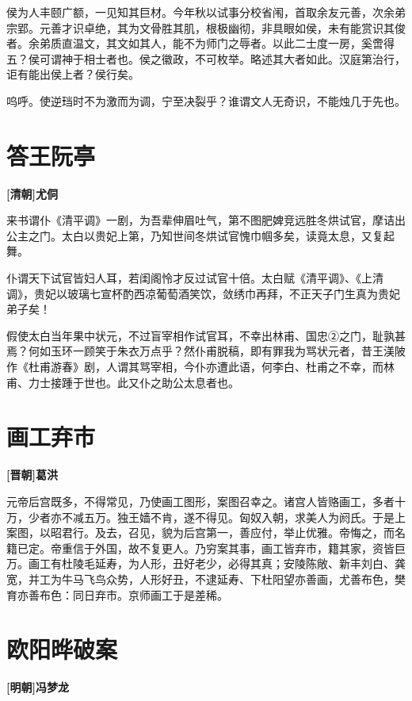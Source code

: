 \documentclass[UTF8,titlepage,oneside]{ctexbook}
\begin{document}
侯为人丰颐广额，一见知其巨材。今年秋以试事分校省闱，首取余友元善，次余弟宗郢。元善才识卓绝，其为文骨胜其肌，根极幽彻，非具眼如侯，未有能赏识其俊者。余弟质直温文，其文如其人，能不为师门之辱者。以此二士度一房，奚啻得五？侯可谓神于相士者也。侯之徽政，不可枚举。略述其大者如此。汉庭第治行，讵有能出侯上者？侯行矣。


呜呼。使逆珰时不为激而为调，宁至决裂乎？谁谓文人无奇识，不能烛几于先也。



\chapter*{答王阮亭}
\begin{center}
	\textbf{[清朝]尤侗}
\end{center}

来书谓仆《清平调》一剧，为吾辈伸眉吐气，第不图肥婢竞远胜冬烘试官，摩诘出公主之门。太白以贵妃上第，乃知世间冬烘试官愧巾帼多矣，读竟太息，又复起舞。

仆谓天下试官皆妇人耳，若闺阁怜才反过试官十倍。太白赋《清平调》、《上清调》，贵妃以玻璃七宣杯酌西凉葡萄酒笑饮，敛绣巾再拜，不正天子门生真为贵妃弟子矣！

假使太白当年果中状元，不过盲宰相作试官耳，不幸出林甫、国忠②之门，耻孰甚焉？何如玉环一顾笑于朱衣万点乎？然仆甫脱稿，即有罪我为骂状元者，昔王渼陂作《杜甫游春》剧，人谓其骂宰相，今仆亦遭此语，何李白、杜甫之不幸，而林甫、力士接踵于世也。此又仆之助公太息者也。


\chapter*{画工弃市}
\begin{center}
	\textbf{[晋朝]葛洪}
\end{center}


元帝后宫既多，不得常见，乃使画工图形，案图召幸之。诸宫人皆赂画工，多者十万，少者亦不减五万。独王嫱不肯，遂不得见。匈奴入朝，求美人为阏氏。于是上案图，以昭君行。及去，召见，貌为后宫第一，善应付，举止优雅。帝悔之，而名籍已定。帝重信于外国，故不复更人。乃穷案其事，画工皆弃市，籍其家，资皆巨万。画工有杜陵毛延寿，为人形，丑好老少，必得其真；安陵陈敞、新丰刘白、龚宽，并工为牛马飞鸟众势，人形好丑，不逮延寿、下杜阳望亦善画，尤善布色，樊育亦善布色：同日弃市。京师画工于是差稀。

\chapter*{欧阳晔破案}
\begin{center}
	\textbf{[明朝]冯梦龙}
\end{center}
\end{document}
